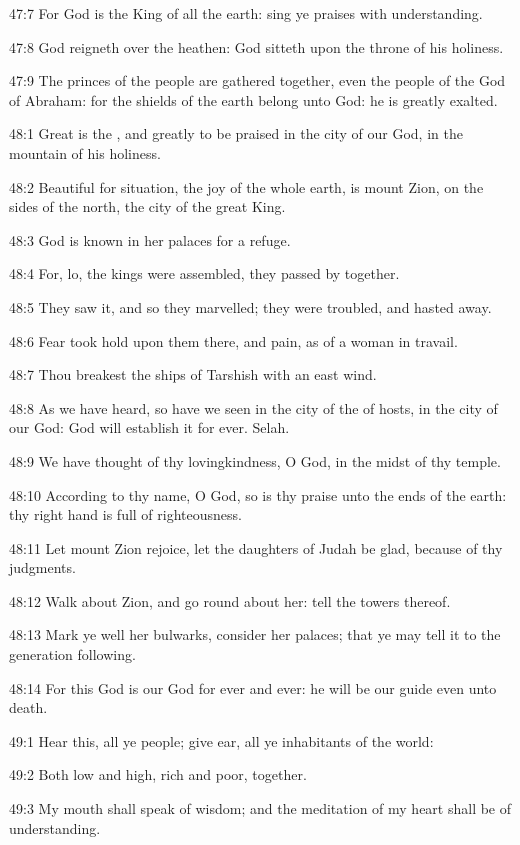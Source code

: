 47:7 For God is the King of all the earth: sing ye praises with
understanding.

47:8 God reigneth over the heathen: God sitteth upon the throne of his
holiness.

47:9 The princes of the people are gathered together, even the people
of the God of Abraham: for the shields of the earth belong unto God:
he is greatly exalted.



48:1 Great is the \LORD, and greatly to be praised in the city of our
God, in the mountain of his holiness.

48:2 Beautiful for situation, the joy of the whole earth, is mount
Zion, on the sides of the north, the city of the great King.

48:3 God is known in her palaces for a refuge.

48:4 For, lo, the kings were assembled, they passed by together.

48:5 They saw it, and so they marvelled; they were troubled, and
hasted away.

48:6 Fear took hold upon them there, and pain, as of a woman in
travail.

48:7 Thou breakest the ships of Tarshish with an east wind.

48:8 As we have heard, so have we seen in the city of the \LORD of
hosts, in the city of our God: God will establish it for ever. Selah.

48:9 We have thought of thy lovingkindness, O God, in the midst of thy
temple.

48:10 According to thy name, O God, so is thy praise unto the ends of
the earth: thy right hand is full of righteousness.

48:11 Let mount Zion rejoice, let the daughters of Judah be glad,
because of thy judgments.

48:12 Walk about Zion, and go round about her: tell the towers
thereof.

48:13 Mark ye well her bulwarks, consider her palaces; that ye may
tell it to the generation following.

48:14 For this God is our God for ever and ever: he will be our guide
even unto death.



49:1 Hear this, all ye people; give ear, all ye inhabitants of the
world:

49:2 Both low and high, rich and poor, together.

49:3 My mouth shall speak of wisdom; and the meditation of my heart
shall be of understanding.

